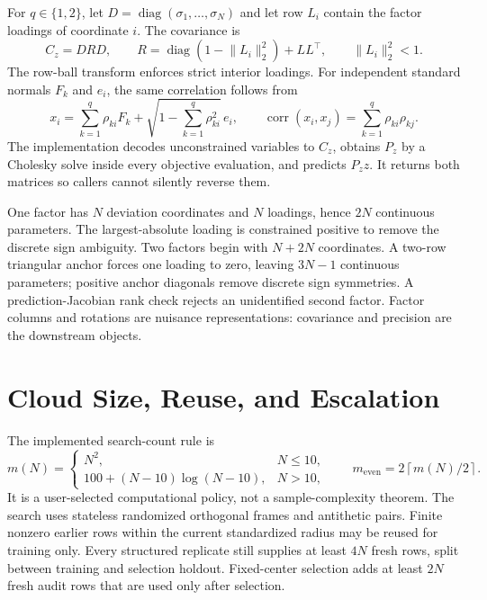For $q\in\{1,2\}$, let $D=\operatorname{diag}(\sigma_1,\ldots,\sigma_N)$ and
let row $L_i$ contain the factor loadings of coordinate $i$.  The covariance is
\begin{equation}
  C_z=D R D,
  \qquad
  R=\operatorname{diag}\!\left(1-\lVert L_i\rVert_2^2\right)+LL^\top,
  \qquad \lVert L_i\rVert_2^2<1.
  \label{eq:bf-factor-correlation-covariance}
\end{equation}
The row-ball transform enforces strict interior loadings.  For independent
standard normals $F_k$ and $e_i$, the same correlation follows from
\begin{equation}
 x_i=\sum_{k=1}^{q}\rho_{ki}F_k+
 \sqrt{1-\sum_{k=1}^{q}\rho_{ki}^2}\,e_i,
 \qquad
 \operatorname{corr}(x_i,x_j)=
 \sum_{k=1}^{q}\rho_{ki}\rho_{kj}.
 \label{eq:bf-factor-correlation-identity}
\end{equation}
The implementation decodes unconstrained variables to $C_z$, obtains $P_z$ by
a Cholesky solve inside every objective evaluation, and predicts $P_z z$.  It
returns both matrices so callers cannot silently reverse them.

One factor has $N$ deviation coordinates and $N$ loadings, hence $2N$
continuous parameters.  The largest-absolute loading is constrained positive
to remove the discrete sign ambiguity.  Two factors begin with $N+2N$
coordinates.  A two-row triangular anchor forces one loading to zero, leaving
$3N-1$ continuous parameters; positive anchor diagonals remove discrete sign
symmetries.  A prediction-Jacobian rank check rejects an unidentified second
factor.  Factor columns and rotations are nuisance representations: covariance
and precision are the downstream objects.

\section{Cloud Size, Reuse, and Escalation}
\label{sec:bf-curvature-cloud-policy}

The implemented search-count rule is
\begin{equation}
 m(N)=
 \begin{cases}
   N^2, & N\leq 10,\\
   100+(N-10)\log(N-10), & N>10,
 \end{cases}
 \qquad
 m_{\mathrm{even}}=2\left\lceil m(N)/2\right\rceil .
 \label{eq:bf-dimension-scaled-cloud}
\end{equation}
It is a user-selected computational policy, not a sample-complexity theorem.
The search uses stateless randomized orthogonal frames and antithetic pairs.
Finite nonzero earlier rows within the current standardized radius may be
reused for training only.  Every structured replicate still supplies at least
$4N$ fresh rows, split between training and selection holdout.  Fixed-center
selection adds at least $2N$ fresh audit rows that are used only after selection.

